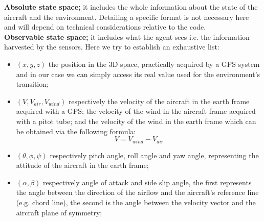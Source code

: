 \documentclass[]{article}
\begin{document}
\noindent \textbf{Absolute state space;} it includes the whole information about the state of the aircraft and the environment. Detailing a specific format is not necessary here and will depend on technical considerations relative to the code.\\

\noindent \textbf{Observable state space;} it includes what the agent sees i.e. the information harvested by the sensors. Here we try to establish an exhaustive list:
\begin{itemize}
	\item $(x,y,z)$ the position in the 3D space, practically acquired by a GPS system and in our case we can simply access its real value used for the environment's transition;
	
	\item $(V, V_{air}, V_{wind})$ respectively the velocity of the aircraft in the earth frame acquired with a GPS; the velocity of the wind in the aircraft frame acquired with a pitot tube; and the velocity of the wind in the earth frame which can be obtained via the following formula:
	\begin{equation*}
		V = V_{wind} - V_{air}
	\end{equation*}
	
	\item $(\theta, \phi, \psi)$ respectively pitch angle, roll angle and yaw angle, representing the attitude of the aircraft in the earth frame;

	\item $(\alpha,\beta)$ respectively angle of attack and side slip angle, the first represents the angle between the direction of the airflow and the aircraft's reference line (e.g. chord line), the second is the angle between the velocity vector and the aircraft plane of symmetry;
	

\end{itemize}
\end{document}
